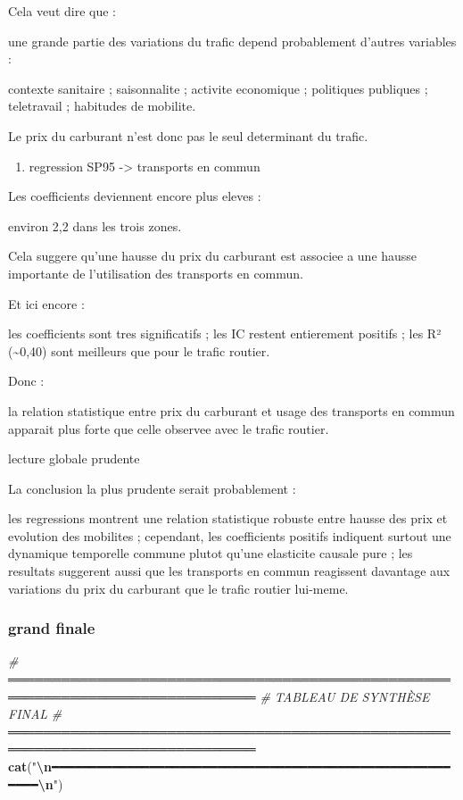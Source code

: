 \documentclass[
]{article}
\newenvironment{Shaded}{\begin{snugshade}}{\end{snugshade}}
\newcommand{\CommentTok}[1]{\textcolor[rgb]{0.56,0.35,0.01}{\textit{#1}}}
\newcommand{\FunctionTok}[1]{\textcolor[rgb]{0.13,0.29,0.53}{\textbf{#1}}}
\newcommand{\NormalTok}[1]{#1}
\newcommand{\SpecialCharTok}[1]{\textcolor[rgb]{0.81,0.36,0.00}{\textbf{#1}}}
\newcommand{\StringTok}[1]{\textcolor[rgb]{0.31,0.60,0.02}{#1}}
\providecommand{\tightlist}{%
  \setlength{\itemsep}{0pt}\setlength{\parskip}{0pt}}
\begin{document}
Cela veut dire que :

une grande partie des variations du trafic depend probablement d'autres
variables :

contexte sanitaire ; saisonnalite ; activite economique ; politiques
publiques ; teletravail ; habitudes de mobilite.

Le prix du carburant n'est donc pas le seul determinant du trafic.

\begin{enumerate}
\def\labelenumi{\arabic{enumi}.}
\setcounter{enumi}{4}
\tightlist
\item
  regression SP95 -\textgreater{} transports en commun
\end{enumerate}

Les coefficients deviennent encore plus eleves :

environ 2,2 dans les trois zones.

Cela suggere qu'une hausse du prix du carburant est associee a une
hausse importante de l'utilisation des transports en commun.

Et ici encore :

les coefficients sont tres significatifs ; les IC restent entierement
positifs ; les R² (\textasciitilde0,40) sont meilleurs que pour le
trafic routier.

Donc :

la relation statistique entre prix du carburant et usage des transports
en commun apparait plus forte que celle observee avec le trafic routier.

lecture globale prudente

La conclusion la plus prudente serait probablement :

les regressions montrent une relation statistique robuste entre hausse
des prix et evolution des mobilites ; cependant, les coefficients
positifs indiquent surtout une dynamique temporelle commune plutot
qu'une elasticite causale pure ; les resultats suggerent aussi que les
transports en commun reagissent davantage aux variations du prix du
carburant que le trafic routier lui-meme.

\subsubsection{grand finale}\label{grand-finale}

\begin{Shaded}
\begin{Highlighting}[]
\CommentTok{\# ══════════════════════════════════════════════════════════════════════════════}
\CommentTok{\#  TABLEAU DE SYNTHÈSE FINAL}
\CommentTok{\# ══════════════════════════════════════════════════════════════════════════════}
\FunctionTok{cat}\NormalTok{(}\StringTok{"}\SpecialCharTok{\textbackslash{}n}\StringTok{━━━━━━━━━━━━━━━━━━━━━━━━━━━━━━━━━━━━━━━━━━━━━━━━━━━━━━━━━}\SpecialCharTok{\textbackslash{}n}\StringTok{"}\NormalTok{)}
\end{Highlighting}
\end{Shaded}
\end{document}
